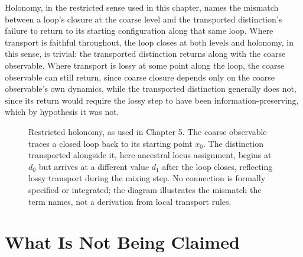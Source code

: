 \documentclass[11pt]{book}
\begin{document}
Holonomy, in the restricted sense used in this chapter, names the mismatch between a loop's closure at the coarse level and the transported distinction's failure to return to its starting configuration along that same loop. Where transport is faithful throughout, the loop closes at both levels and holonomy, in this sense, is trivial: the transported distinction returns along with the coarse observable. Where transport is lossy at some point along the loop, the coarse observable can still return, since coarse closure depends only on the coarse observable's own dynamics, while the transported distinction generally does not, since its return would require the lossy step to have been information-preserving, which by hypothesis it was not.

\begin{figure}[h]
\centering
{}
\caption{Restricted holonomy, as used in Chapter 5. The coarse observable traces a closed loop back to its starting point $x_0$. The distinction transported alongside it, here ancestral locus assignment, begins at $d_0$ but arrives at a different value $d_1$ after the loop closes, reflecting lossy transport during the mixing step. No connection is formally specified or integrated; the diagram illustrates the mismatch the term names, not a derivation from local transport rules.}
\label{fig:holonomy-loop}
\end{figure}

\section{What Is Not Being Claimed}
\end{document}
